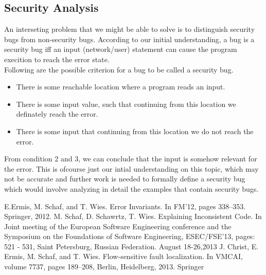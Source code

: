\documentclass{article}
\begin{document}
\subsection{Security Analysis}
An interseting problem that we might be able to solve is to distinguish security bugs from non-security bugs. According to our initial understanding, a bug is a security bug iff an input (network/user) statement can cause the program execition to reach the error state. \\
Following are the possible criterion for a bug to be called a security bug.
\begin{itemize}
  \item There  is some reachable location where a program reads an input.
  \item There is some input value, such that continuing from this location we definately reach the error.
  \item There is some input that continuing from this location we do not reach the error.
\end{itemize}
From condition 2 and 3, we can conclude that the input is somehow relevant for the error. This is ofcourse just our intial understanding on this topic, which may not be accurate and further work is needed to formally define a security bug which would involve analyzing in detail the examples that contain security bugs.
\newpage

\begin{thebibliography}{9}
E.Ermis, M. Schaf, and T. Wies. Error Invariants. In FM’12, pages 338–353. Springer, 2012.
M. Schaf, D. Schawrtz, T. Wies. Explaining Inconsistent Code. In Joint meeting of the European Software Engineering conference and the Symposium on the Foundations of Software Engineering, ESEC/FSE’13, pages: 521 - 531, Saint Petersburg, Russian Federation. August 18-26,2013 
J. Christ, E. Ermis, M. Schaf, and T. Wies. Flow-sensitive fault localization. In VMCAI, volume 7737, pages 189–208, Berlin, Heidelberg, 2013. Springer 
\end{thebibliography}
\end{document}
